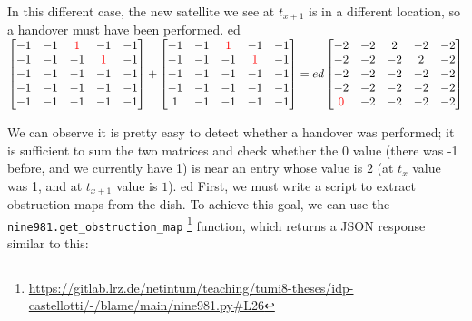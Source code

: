 \documentclass[IN,11pt,twoside,openright,idp,english]{tumthesis}
\begin{document}
In this different case, the new satellite we see at $ t_{x+1} $ is in a different location, so a handover must have been performed. \vspace{10mm}
ed
$\begin{bmatrix}
-1 & -1 & \color{red}1 &           -1 & -1 \\
-1 & -1 &           -1 & \color{red}1 & -1 \\
-1 & -1 &           -1 &           -1 & -1 \\
-1 & -1 &           -1 &           -1 & -1 \\
-1 & -1 &           -1 &           -1 & -1 \\
\end{bmatrix}
+
\begin{bmatrix}
-1 & -1 & \color{red}1 &           -1 & -1 \\
-1 & -1 &           -1 & \color{red}1 & -1 \\
-1 & -1 &           -1 &           -1 & -1 \\
-1 & -1 &           -1 &           -1 & -1 \\
1 & -1 &            -1 &           -1 & -1 \\
\end{bmatrix}
=ed
\begin{bmatrix}
          -2 & -2 & 2 & -2 & -2 \\
          -2 & -2 & -2 & 2 & -2 \\
          -2 & -2 & -2 & -2 & -2 \\
          -2 & -2 & -2 & -2 & -2 \\
\color{red}0 & -2 & -2 & -2 & -2 \\
\end{bmatrix}$

\vspace{10mm}

We can observe it is pretty easy to detect whether a handover was performed; it is sufficient to sum the two matrices and check whether the $ 0 $ value (there was -1 before, and we currently have 1) is near an entry whose value is $ 2 $ (at $ t_{x} $ value was 1, and at $ t_{x+1} $ value is $ 1 $). 
ed
First, we must write a script to extract obstruction maps from the dish. To achieve this goal, we can use the \texttt{nine981.get\_obstruction\_map} \footnote{\url{https://gitlab.lrz.de/netintum/teaching/tumi8-theses/idp-castellotti/-/blame/main/nine981.py\#L26}} function, which returns a JSON response similar to this:
\end{document}
